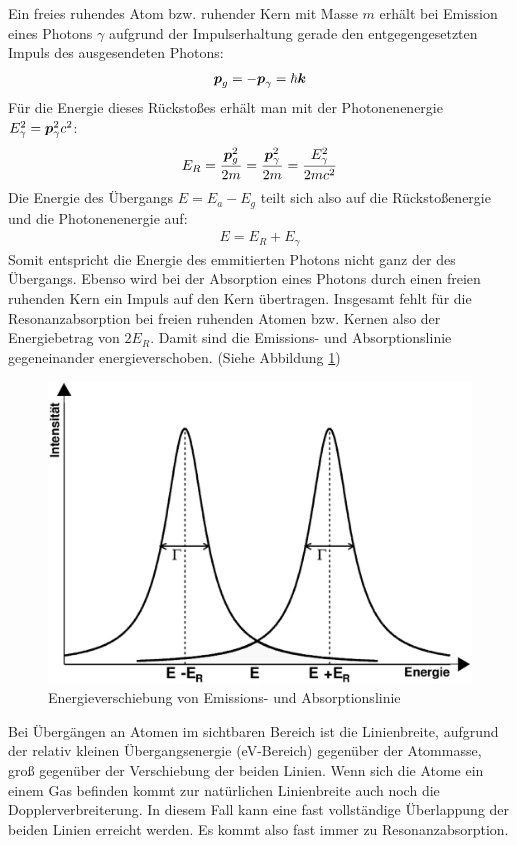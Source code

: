 \documentclass[12pt]{article}
\renewcommand*\vec[1]{{\mbox{\boldmath\ensuremath{#1}}}}
\begin{document}
Ein freies ruhendes Atom bzw. ruhender Kern mit Masse $m$ erhält bei Emission eines Photons $\gamma$ aufgrund der Impulserhaltung
gerade den entgegengesetzten Impuls des ausgesendeten Photons:
\begin{align}
 \vec{p}_g = -\vec{p}_\gamma = \hbar\vec{k}
\end{align}
Für die Energie dieses Rückstoßes erhält man mit der Photonenenergie $E^2_\gamma = \vec{p}^2_\gamma c^2$:
\begin{align}
 E_R = \frac{\vec{p}_g^2}{2m} = \frac{\vec{p}^2_\gamma}{2m} = \frac{E^2_\gamma}{2mc^2}
 \label{e_r}
\end{align}
Die Energie des Übergangs $E = E_a - E_g$ teilt sich also auf die Rückstoßenergie und die Photonenenergie auf:
\begin{align}
 E = E_R + E_\gamma
\end{align}
Somit entspricht die Energie des emmitierten Photons nicht ganz der des Übergangs. Ebenso wird bei der Absorption eines Photons durch einen freien ruhenden
Kern ein Impuls auf den Kern übertragen. Insgesamt fehlt für die Resonanzabsorption bei freien ruhenden Atomen bzw. Kernen also der Energiebetrag von $2E_R$.
Damit sind die Emissions- und Absorptionslinie gegeneinander energieverschoben. (Siehe Abbildung \ref{energieverschiebung})
\begin{figure}
 \includegraphics[width=0.9\linewidth]{pictures/energieverschiebung.eps}
 \caption{Energieverschiebung von Emissions- und Absorptionslinie}
 \label{energieverschiebung}
\end{figure}
Bei Übergängen an Atomen im sichtbaren Bereich ist die Linienbreite, aufgrund der relativ kleinen Übergangsenergie (eV-Bereich) gegenüber der Atommasse,
groß gegenüber der Verschiebung der beiden Linien. Wenn sich die Atome ein einem Gas befinden kommt zur natürlichen Linienbreite auch noch die Dopplerverbreiterung.
In diesem Fall kann eine fast vollständige Überlappung der beiden Linien erreicht werden. Es kommt also fast immer zu Resonanzabsorption.
\end{document}
